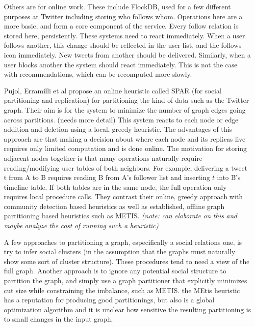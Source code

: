 Others are for online work. These include FlockDB, used for a few different purposes at Twitter including storing who follows whom. Operations here are a more basic, and form a core component of the service. Every follow relation is stored here, persistently. These systems need to react immediately. When a user follows another, this change  should be reflected in the user list, and the follows icon immediately. New tweets from another should be delivered. Similarly, when a user blocks another the system should react immediately. This is not the case with recommendations, which can be recomputed more slowly.

Pujol, Erramilli et al \cite{little} propose an online heuristic called SPAR (for social partitioning and replication) for partitioning the kind of data such as the Twitter graph. Their aim is for the system to minimize the number of graph edges going across partitions. (needs more detail)  This system reacts to each node or edge  addition and deletion using a local, greedy heuristic. The advantages of this approach are that making a decision about where each node and its replicas live requires only limited computation and is done online. The motivation for storing adjacent nodes together is that many operations naturally require reading/modifying user tables of both neighbors.   For example, delivering a tweet t from A to B requires reading B from A's follower list and inserting $t$ into B's timeline table. If both tables are in the same node, the full operation only requires local procedure calls.  They contrast their online, greedy approach with community detection based heuristics as well as established, offline graph partitioning based heuristics such as METIS.  \emph{(note: can elaborate on this and maybe analyze the cost of running such a heuristic)}

A few approaches to partitioning a graph, especifically a social relations one, is try to infer social clusters (in the assumption that the graphs must naturally show some sort of cluster structure). These procedures tend to need a view of the full graph. Another approach is to ignore any potential social structure to partition the graph, and simply  use a graph partitioner that explicitly minimizes cut size while constraining the imbalance,  such as METIS. the MEtis heuristic has a reputation for producing good partitionings, but also is a global optimization algorithm and it is unclear how sensitive the resulting partitioning is to small changes in the input graph. 

